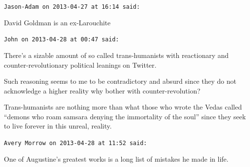 \begin{footnotesize}
\begin{sffamily}
\texttt{Jason-Adam on 2013-04-27 at 16:14 said:}

David Goldman is an ex-Larouchite

\hfill

\texttt{John on 2013-04-28 at 00:47 said:}

There's a sizable amount of so called trans-humanists with reactionary and counter-revolutionary political leanings on Twitter.

Such reasoning seems to me to be contradictory and absurd since they do not acknowledge a higher reality why bother with counter-revolution?

Trans-humanists are nothing more than what those who wrote the Vedas called ``demons who roam samsara denying the immortality of the soul'' since they seek to live forever in this unreal, reality.

\hfill

\texttt{Avery Morrow on 2013-04-28 at 11:52 said:}

One of Augustine's greatest works is a long list of mistakes he made in life.

\end{sffamily}
\end{footnotesize}

